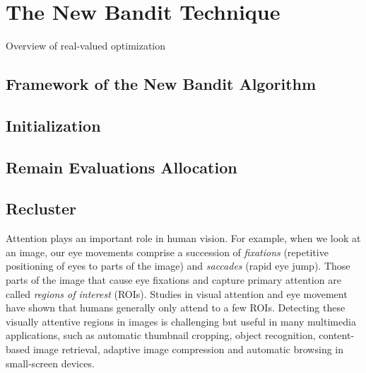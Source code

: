 \chapter{The New Bandit Technique}
\label{c:new_bandit}

Overview of real-valued optimization

\section{Framework of the New Bandit Algorithm}
\section{Initialization}
\section{Remain Evaluations Allocation}
\section{Recluster}



Attention plays an important role in human vision. For example, when
we look at an image, our eye movements comprise a succession of {\em
fixations} (repetitive positioning of eyes to parts of the image)
and {\em saccades} (rapid eye jump). Those parts of the image that
cause eye fixations and capture primary attention are called {\em
regions of interest} (ROIs). Studies in visual attention and eye
movement have shown that humans generally only attend to a few ROIs.
Detecting these visually attentive regions in images is challenging
but useful in many multimedia applications, such as automatic
thumbnail cropping, object recognition, content-based image
retrieval, adaptive image compression and automatic browsing in
small-screen devices.

